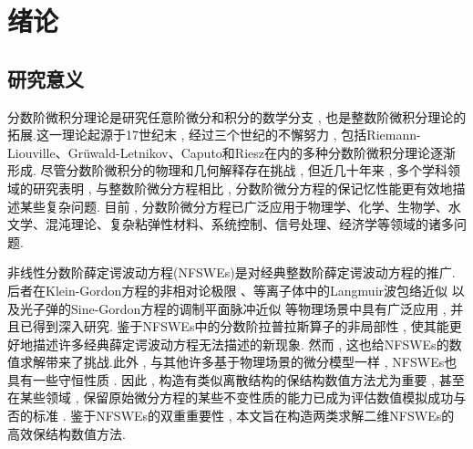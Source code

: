 \chapter[绪论]{绪论}

\section{研究意义}

分数阶微积分理论是研究任意阶微分和积分的数学分支 , 也是整数阶微积分理论的拓展.这一理论起源于17世纪末 , 经过三个世纪的不懈努力 , 包括Riemann-Liouville、Grüwald-Letnikov、Caputo和Riesz在内的多种分数阶微积分理论逐渐形成\cite{samkoFractionalIntegralsDerivatives1993}.
尽管分数阶微积分的物理和几何解释存在挑战 , 但近几十年来 , 多个学科领域的研究表明 , 与整数阶微分方程相比 , 分数阶微分方程的保记忆性能更有效地描述某些复杂问题.
目前 , 分数阶微分方程已广泛应用于物理学、化学、生物学、水文学、混沌理论、复杂粘弹性材料、系统控制、信号处理、经济学等领域的诸多问题\cite{liIntroductionFractionalCalculus2015,HandbookDifferentialEquations2008,brychkovIndefiniteIntegrals2008,zhangMassBalanceBased2005,carrerasAnomalousDiffusionExit2001,maginSolvingFractionalOrder2009,zaslavskySelfsimilarTransportIncomplete1993,sunRandomorderFractionalDifferential2011}.%

非线性分数阶薛定谔波动方程(NFSWEs)是对经典整数阶薛定谔波动方程的推广.
后者在Klein-Gordon方程的非相对论极限 \cite{tsutsumiNonrelativisticApproximationNonlinear1984,machiharaNonrelativisticLimitEnergy2002}、等离子体中的Langmuir波包络近似 \cite{colinSemidiscretizationTimeNonlinear1998}
以及光子弹的Sine-Gordon方程的调制平面脉冲近似 \cite{baoComparisonsSineGordonPerturbed2010,xinModelingLightBullets2000}等物理场景中具有广泛应用 , 并且已得到深入研究\cite{zhangConservativeNumericalScheme2003,baoUniformErrorEstimates2012,chengSeveralConservativeCompact2018,brugnanoClassEnergyconservingHamiltonian2018}.
鉴于NFSWEs中的分数阶拉普拉斯算子的非局部性 , 使其能更好地描述许多经典薛定谔波动方程无法描述的新现象.
然而 , 这也给NFSWEs的数值求解带来了挑战.此外 , 与其他许多基于物理场景的微分模型一样 , NFSWEs也具有一些守恒性质 . 
因此 , 构造有类似离散结构的保结构数值方法尤为重要 , 甚至在某些领域 , 保留原始微分方程的某些不变性质的能力已成为评估数值模拟成功与否的标准 \cite{liFiniteDifferenceCalculus1995,fengHamilton1991}.
鉴于NFSWEs的双重重要性 , 本文旨在构造两类求解二维NFSWEs的高效保结构数值方法.

